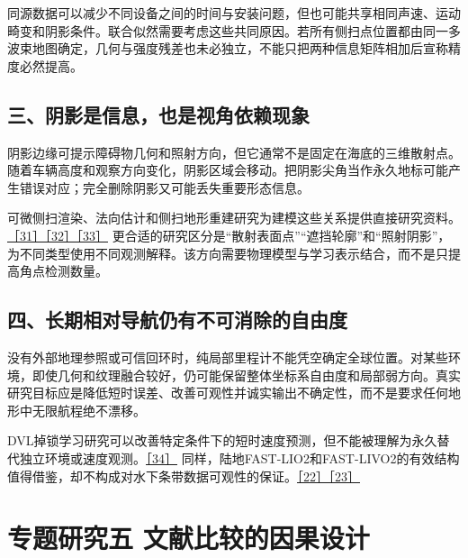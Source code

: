 同源数据可以减少不同设备之间的时间与安装问题，但也可能共享相同声速、运动畸变和阴影条件。联合似然需要考虑这些共同原因。若所有侧扫点位置都由同一多波束地图确定，几何与强度残差也未必独立，不能只把两种信息矩阵相加后宣称精度必然提高。

\hypertarget{ux4e09ux9634ux5f71ux662fux4fe1ux606fux4e5fux662fux89c6ux89d2ux4f9dux8d56ux73b0ux8c61}{%
\subsection{三、阴影是信息，也是视角依赖现象}\label{ux4e09ux9634ux5f71ux662fux4fe1ux606fux4e5fux662fux89c6ux89d2ux4f9dux8d56ux73b0ux8c61}}

阴影边缘可提示障碍物几何和照射方向，但它通常不是固定在海底的三维散射点。随着车辆高度和观察方向变化，阴影区域会移动。把阴影尖角当作永久地标可能产生错误对应；完全删除阴影又可能丢失重要形态信息。

可微侧扫渲染、法向估计和侧扫地形重建研究为建模这些关系提供直接研究资料。\href{https://arxiv.org/abs/2206.07821}{［31］}\href{https://arxiv.org/abs/2206.07819}{［32］}\href{https://arxiv.org/abs/2206.07810}{［33］} 更合适的研究区分是``散射表面点''``遮挡轮廓''和``照射阴影''，为不同类型使用不同观测解释。该方向需要物理模型与学习表示结合，而不是只提高角点检测数量。

\hypertarget{ux56dbux957fux671fux76f8ux5bf9ux5bfcux822aux4ecdux6709ux4e0dux53efux6d88ux9664ux7684ux81eaux7531ux5ea6}{%
\subsection{四、长期相对导航仍有不可消除的自由度}\label{ux56dbux957fux671fux76f8ux5bf9ux5bfcux822aux4ecdux6709ux4e0dux53efux6d88ux9664ux7684ux81eaux7531ux5ea6}}

没有外部地理参照或可信回环时，纯局部里程计不能凭空确定全球位置。对某些环境，即使几何和纹理融合较好，仍可能保留整体坐标系自由度和局部弱方向。真实研究目标应是降低短时误差、改善可观性并诚实输出不确定性，而不是要求任何地形中无限航程绝不漂移。

DVL掉锁学习研究可以改善特定条件下的短时速度预测，但不能被理解为永久替代独立环境或速度观测。\href{https://arxiv.org/abs/2504.07697}{［34］} 同样，陆地FAST-LIO2和FAST-LIVO2的有效结构值得借鉴，却不构成对水下条带数据可观性的保证。\href{https://arxiv.org/abs/2107.06829}{［22］}\href{https://arxiv.org/abs/2408.14035}{［23］}

\hypertarget{ux4e13ux9898ux7814ux7a76ux4e94-ux6587ux732eux6bd4ux8f83ux7684ux56e0ux679cux8bbeux8ba1}{%
\section{专题研究五 文献比较的因果设计}\label{ux4e13ux9898ux7814ux7a76ux4e94-ux6587ux732eux6bd4ux8f83ux7684ux56e0ux679cux8bbeux8ba1}}

